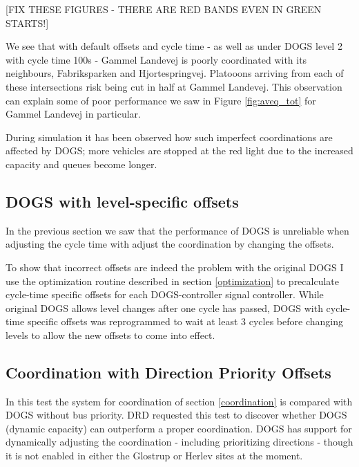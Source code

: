 [FIX THESE FIGURES - THERE ARE RED BANDS EVEN IN GREEN STARTS!]

We see that with default offsets and cycle time - as well as under DOGS level 2 with cycle time 100s - Gammel Landevej is poorly coordinated with its neighbours, Fabriksparken and Hjortespringvej. Platooons arriving from each of these intersections risk being cut in half at Gammel Landevej. This observation can explain some of poor performance we saw in Figure \ref{fig:aveq_tot} for Gammel Landevej in particular.

During simulation it has been observed how such imperfect coordinations are affected by DOGS; more vehicles are stopped at the red light due to the increased capacity and queues become longer.

\subsection{DOGS with level-specific offsets}
In the previous section we saw that the performance of DOGS is unreliable when adjusting the cycle time with adjust the coordination by changing the offsets.

To show that incorrect offsets are indeed the problem with the original DOGS I use the optimization routine described in section \ref{optimization} to precalculate cycle-time specific offsets for each DOGS-controller signal controller. While original DOGS allows level changes after one cycle has passed, DOGS with cycle-time specific offsets was reprogrammed to wait at least 3 cycles before changing levels to allow the new offsets to come into effect.

\subsection{Coordination with Direction Priority Offsets}
In this test the system for coordination of section \ref{coordination} is compared with DOGS without bus priority. DRD requested this test to discover whether DOGS (dynamic capacity) can outperform a proper coordination. DOGS has support for dynamically adjusting the coordination - including prioritizing directions - though it is not enabled in either the Glostrup or Herlev sites at the moment.

